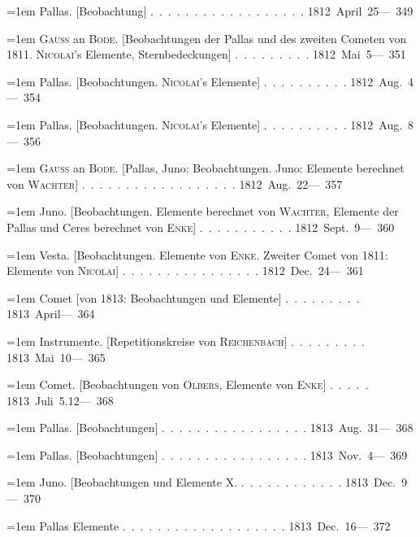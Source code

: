\noindent\hangindent=1em Pallas. [Beobachtung] \mbox{.\ .\ .\ .\ .\ .\ .\ .\ .\ .\ .\ .\ .\ .\ .\ .\ .\ .} \hfill\mbox{1812 April 25}\quad\mbox{--- 349}\par\smallskip
\noindent\hangindent=1em \textsc{Gauss} an \textsc{Bode}. [Beobachtungen der Pallas und des zweiten Cometen von 1811. \textsc{Nicolai}'s Elemente, Sternbedeckungen] \mbox{.\ .\ .\ .\ .\ .\ .\ .\ .} \hfill\mbox{1812 Mai 5}\quad\mbox{--- 351}\par\smallskip
\noindent\hangindent=1em Pallas. [Beobachtungen. \textsc{Nicolai}'s Elemente] \mbox{.\ .\ .\ .\ .\ .\ .\ .\ .\ .} \hfill\mbox{1812 Aug. 4}\quad\mbox{--- 354}\par\smallskip
\noindent\hangindent=1em Pallas. [Beobachtungen. \textsc{Nicolai}'s Elemente] \mbox{.\ .\ .\ .\ .\ .\ .\ .\ .\ .} \hfill\mbox{1812 Aug. 8}\quad\mbox{--- 356}\par\smallskip
\noindent\hangindent=1em \textsc{Gauss} an \textsc{Bode}. [Pallas, Juno: Beobachtungen. Juno: Elemente berechnet von \textsc{Wachter}] \mbox{.\ .\ .\ .\ .\ .\ .\ .\ .\ .\ .\ .\ .\ .\ .\ .\ .\ .} \hfill\mbox{1812 Aug. 22}\quad\mbox{--- 357}\par\smallskip
\noindent\hangindent=1em Juno. [Beobachtungen. Elemente berechnet von \textsc{Wachter}, Elemente der Pallas und Ceres berechnet von \textsc{Enke}] \mbox{.\ .\ .\ .\ .\ .\ .\ .\ .\ .\ .} \hfill\mbox{1812 Sept. 9}\quad\mbox{--- 360}\par\smallskip
\noindent\hangindent=1em Vesta. [Beobachtungen. Elemente von \textsc{Enke}. Zweiter Comet von 1811: Elemente von \textsc{Nicolai}] \mbox{.\ .\ .\ .\ .\ .\ .\ .\ .\ .\ .\ .\ .\ .\ .\ .} \hfill\mbox{1812 Dec. 24}\quad\mbox{--- 361}\par\smallskip
\noindent\hangindent=1em Comet [von 1813: Beobachtungen und Elemente] \mbox{.\ .\ .\ .\ .\ .\ .\ .\ .} \hfill\mbox{1813 April}\quad\mbox{--- 364}\par\smallskip
\noindent\hangindent=1em Instrumente. [Repetitionskreise von \textsc{Reichenbach}] \mbox{.\ .\ .\ .\ .\ .\ .\ .\ .} \hfill\mbox{1813 Mai 10}\quad\mbox{--- 365}\par\smallskip
\noindent\hangindent=1em Comet. [Beobachtungen von \textsc{Olbers}, Elemente von \textsc{Enke}] \mbox{.\ .\ .\ .\ .} \hfill\mbox{1813 Juli 5.12}\quad\mbox{--- 368}\par\smallskip
\noindent\hangindent=1em Pallas. [Beobachtungen] \mbox{.\ .\ .\ .\ .\ .\ .\ .\ .\ .\ .\ .\ .\ .\ .\ .\ .} \hfill\mbox{1813 Aug. 31}\quad\mbox{--- 368}\par\smallskip
\noindent\hangindent=1em Pallas. [Beobachtungen] \mbox{.\ .\ .\ .\ .\ .\ .\ .\ .\ .\ .\ .\ .\ .\ .\ .\ .} \hfill\mbox{1813 Nov. 4}\quad\mbox{--- 369}\par\smallskip
\noindent\hangindent=1em Juno. [Beobachtungen und Elemente X. \mbox{.\ .\ .\ .\ .\ .\ .\ .\ .\ .\ .\ .} \hfill\mbox{1813 Dec. 9}\quad\mbox{--- 370}\par\smallskip
\noindent\hangindent=1em \hspace{1em}Pallas Elemente \mbox{.\ .\ .\ .\ .\ .\ .\ .\ .\ .\ .\ .\ .\ .\ .\ .\ .\ .\ .} \hfill\mbox{1813 Dec. 16}\quad\mbox{--- 372}\par\smallskip
\endgroup
